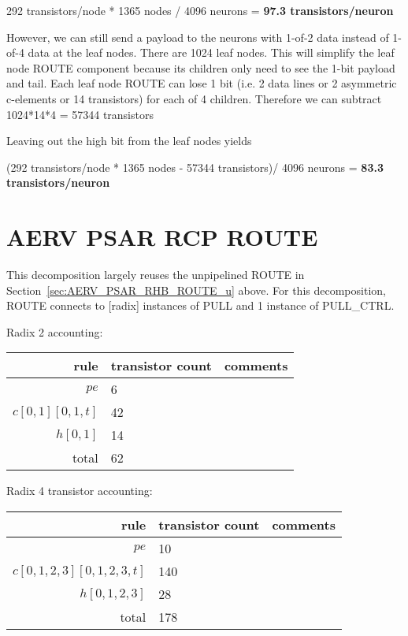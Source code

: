 \documentclass{article}
\begin{document}
292 transistors/node * 1365 nodes / 4096 neurons = \textbf{97.3 transistors/neuron}

However, we can still send a payload to the neurons with 1-of-2 data instead of 1-of-4 data at the leaf nodes.
There are 1024 leaf nodes. 
This will simplify the leaf node ROUTE component because its children only need to see the 1-bit payload and tail.
Each leaf node ROUTE can lose 1 bit (i.e. 2 data lines or 2 asymmetric c-elements or 14 transistors) for each of 4 children.
Therefore we can subtract 1024*14*4 = 57344 transistors

\noindent Leaving out the high bit from the leaf nodes yields

(292 transistors/node * 1365 nodes - 57344 transistors)/ 4096 neurons = \textbf{83.3 transistors/neuron}
\section{AERV PSAR RCP ROUTE \label{sec:AERV_PSAR_RCP_ROUTE}}

This decomposition largely reuses the unpipelined ROUTE in Section~\ref{sec:AERV_PSAR_RHB_ROUTE_u} above. 
For this decomposition, ROUTE connects to [radix] instances of PULL and 1 instance of PULL\_CTRL.

\noindent Radix 2 accounting:

\begin{center}
    \begin{tabular}{|r|l|l|}
    \hline
    rule & transistor count & comments \\ \hline
    $pe$ & 6 & \\ \hline
    $c[0,1][0,1,t]$ & 42 & \\ \hline
    $h[0,1]$ & 14 & \\ \hline \hline
    total & 62 & \\ \hline
    \end{tabular}
\end{center}

\noindent Radix 4 transistor accounting: 

\begin{center}
    \begin{tabular}{|r|l|l|}
    \hline
    rule & transistor count & comments \\ \hline
    $pe$ & 10 & \\ \hline
    $c[0,1,2,3][0,1,2,3,t]$ & 140 & \\ \hline
    $h[0,1,2,3]$ & 28 & \\ \hline \hline
    total & 178 & \\ \hline
    \end{tabular}
\end{center}
\end{document}

